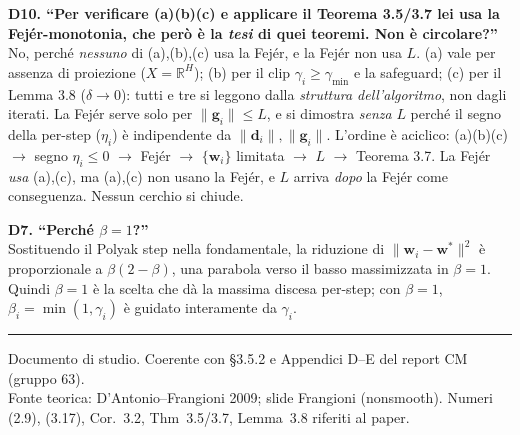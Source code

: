\documentclass[11pt,a4paper]{article}
\theoremstyle{definition}
\newcommand{\w}{\bm{w}}
\newcommand{\g}{\bm{g}}
\newcommand{\dvec}{\bm{d}}
\newcommand{\wstar}{\w^{*}}
\newcommand{\gmin}{\gamma_{\min}}
\newcommand{\norm}[1]{\lVert #1\rVert}
\newcommand{\R}{\mathbb{R}}
\begin{document}
\begin{oralbox}
\textbf{D10. ``Per verificare (a)(b)(c) e applicare il Teorema 3.5/3.7 lei usa la
Fej\'er-monotonia, che però è la \emph{tesi} di quei teoremi. Non è circolare?''}\\
No, perché \emph{nessuno} di (a),(b),(c) usa la Fej\'er, e la Fej\'er non usa $L$. (a) vale per
assenza di proiezione ($X=\R^H$); (b) per il clip $\gamma_i\ge\gmin$ e la safeguard; (c) per il
Lemma 3.8 ($\delta\to0$): tutti e tre si leggono dalla \emph{struttura dell'algoritmo}, non
dagli iterati. La Fej\'er serve solo per $\norm{\g_i}\le L$, e si dimostra \emph{senza} $L$
perché il segno della per-step ($\eta_i$) è indipendente da $\norm{\dvec_i},\norm{\g_i}$.
L'ordine è aciclico: (a)(b)(c) $\to$ segno $\eta_i\le0$ $\to$ Fej\'er $\to$ $\{\w_i\}$ limitata
$\to$ $L$ $\to$ Teorema 3.7. La Fej\'er \emph{usa} (a),(c), ma (a),(c) non usano la Fej\'er, e
$L$ arriva \emph{dopo} la Fej\'er come conseguenza. Nessun cerchio si chiude.
\end{oralbox}

\begin{oralbox}
\textbf{D7. ``Perché $\beta=1$?''}\\
Sostituendo il Polyak step nella fondamentale, la riduzione di $\norm{\w_i-\wstar}^2$ è
proporzionale a $\beta(2-\beta)$, una parabola verso il basso massimizzata in $\beta=1$.
Quindi $\beta=1$ è la scelta che dà la massima discesa per-step; con $\beta=1$,
$\beta_i=\min(1,\gamma_i)$ è guidato interamente da $\gamma_i$.
\end{oralbox}

\bigskip
\begin{center}\rule{0.5\textwidth}{0.4pt}\end{center}
\begin{center}\footnotesize
Documento di studio. Coerente con §3.5.2 e Appendici D--E del report CM (gruppo 63).\\
Fonte teorica: D'Antonio--Frangioni 2009; slide Frangioni (nonsmooth). Numeri (2.9), (3.17),
Cor.~3.2, Thm~3.5/3.7, Lemma~3.8 riferiti al paper.
\end{center}
\end{document}
